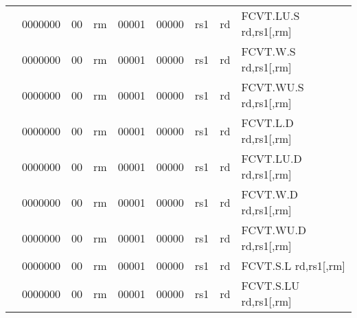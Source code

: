 \begin{table}[p]
\begin{small}
\begin{center}
\begin{tabular}{rcccccccccl}
&
\multicolumn{1}{|c|}{0000000} &
\multicolumn{1}{c|}{00} &
\multicolumn{2}{c|}{rm} &
\multicolumn{2}{c|}{00001} &
\multicolumn{1}{c|}{00000} &
\multicolumn{1}{c|}{rs1} &
\multicolumn{1}{c|}{rd} & FCVT.LU.S rd,rs1[,rm] \\
\cline{2-10}
  

&
\multicolumn{1}{|c|}{0000000} &
\multicolumn{1}{c|}{00} &
\multicolumn{2}{c|}{rm} &
\multicolumn{2}{c|}{00001} &
\multicolumn{1}{c|}{00000} &
\multicolumn{1}{c|}{rs1} &
\multicolumn{1}{c|}{rd} & FCVT.W.S rd,rs1[,rm] \\
\cline{2-10}
  

&
\multicolumn{1}{|c|}{0000000} &
\multicolumn{1}{c|}{00} &
\multicolumn{2}{c|}{rm} &
\multicolumn{2}{c|}{00001} &
\multicolumn{1}{c|}{00000} &
\multicolumn{1}{c|}{rs1} &
\multicolumn{1}{c|}{rd} & FCVT.WU.S rd,rs1[,rm] \\
\cline{2-10}
  

&
\multicolumn{1}{|c|}{0000000} &
\multicolumn{1}{c|}{00} &
\multicolumn{2}{c|}{rm} &
\multicolumn{2}{c|}{00001} &
\multicolumn{1}{c|}{00000} &
\multicolumn{1}{c|}{rs1} &
\multicolumn{1}{c|}{rd} & FCVT.L.D rd,rs1[,rm] \\
\cline{2-10}
  

&
\multicolumn{1}{|c|}{0000000} &
\multicolumn{1}{c|}{00} &
\multicolumn{2}{c|}{rm} &
\multicolumn{2}{c|}{00001} &
\multicolumn{1}{c|}{00000} &
\multicolumn{1}{c|}{rs1} &
\multicolumn{1}{c|}{rd} & FCVT.LU.D rd,rs1[,rm] \\
\cline{2-10}
  

&
\multicolumn{1}{|c|}{0000000} &
\multicolumn{1}{c|}{00} &
\multicolumn{2}{c|}{rm} &
\multicolumn{2}{c|}{00001} &
\multicolumn{1}{c|}{00000} &
\multicolumn{1}{c|}{rs1} &
\multicolumn{1}{c|}{rd} & FCVT.W.D rd,rs1[,rm] \\
\cline{2-10}
  

&
\multicolumn{1}{|c|}{0000000} &
\multicolumn{1}{c|}{00} &
\multicolumn{2}{c|}{rm} &
\multicolumn{2}{c|}{00001} &
\multicolumn{1}{c|}{00000} &
\multicolumn{1}{c|}{rs1} &
\multicolumn{1}{c|}{rd} & FCVT.WU.D rd,rs1[,rm] \\
\cline{2-10}
  

&
\multicolumn{1}{|c|}{0000000} &
\multicolumn{1}{c|}{00} &
\multicolumn{2}{c|}{rm} &
\multicolumn{2}{c|}{00001} &
\multicolumn{1}{c|}{00000} &
\multicolumn{1}{c|}{rs1} &
\multicolumn{1}{c|}{rd} & FCVT.S.L rd,rs1[,rm] \\
\cline{2-10}
  

&
\multicolumn{1}{|c|}{0000000} &
\multicolumn{1}{c|}{00} &
\multicolumn{2}{c|}{rm} &
\multicolumn{2}{c|}{00001} &
\multicolumn{1}{c|}{00000} &
\multicolumn{1}{c|}{rs1} &
\multicolumn{1}{c|}{rd} & FCVT.S.LU rd,rs1[,rm] \\
\cline{2-10}
  


\end{tabular}
\end{center}
\end{small}
\end{table}
